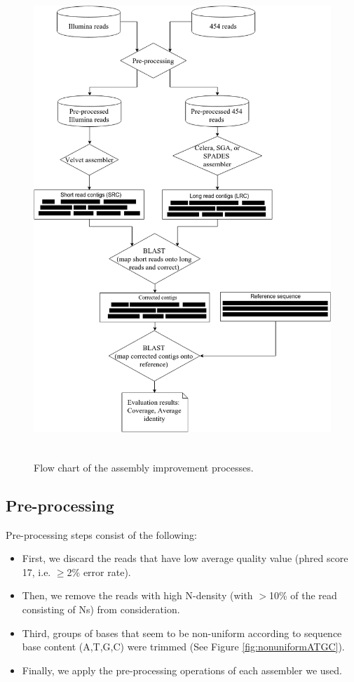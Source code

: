 \documentclass{llncs}
\begin{document}
\begin{figure}[htbp]
\centerline{\includegraphics[width=12cm, height=18cm]{flowChart.png}}
\caption{Flow chart of the assembly improvement processes.}
\label{fig:flowChart}
\end{figure}



\subsection{Pre-processing} 
Pre-processing steps consist of the following: 
\begin{itemize}
\item First, we discard the reads that have low average quality value (phred score 17, i.e. $\geq$2\% error rate). 
\item Then, we remove the reads with high N-density (with $>$10\% of the read consisting of Ns) from consideration.
\item Third, groups of bases that seem to be non-uniform according to sequence base content (A,T,G,C) were trimmed (See Figure \ref{fig:nonuniformATGC}). 
\item Finally, we apply the pre-processing operations of each assembler we used.
\end{itemize}
\end{document}
